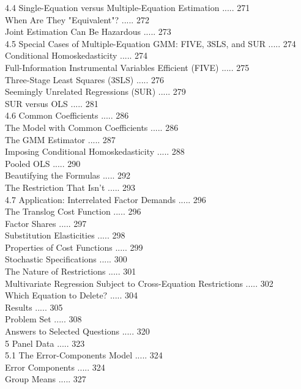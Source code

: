 \documentclass[10pt]{article}
\begin{document}
4.4 Single-Equation versus Multiple-Equation Estimation ..... 271\\
When Are They "Equivalent"? ..... 272\\
Joint Estimation Can Be Hazardous ..... 273\\
4.5 Special Cases of Multiple-Equation GMM: FIVE, 3SLS, and SUR ..... 274\\
Conditional Homoskedasticity ..... 274\\
Full-Information Instrumental Variables Efficient (FIVE) ..... 275\\
Three-Stage Least Squares (3SLS) ..... 276\\
Seemingly Unrelated Regressions (SUR) ..... 279\\
SUR versus OLS ..... 281\\
4.6 Common Coefficients ..... 286\\
The Model with Common Coefficients ..... 286\\
The GMM Estimator ..... 287\\
Imposing Conditional Homoskedasticity ..... 288\\
Pooled OLS ..... 290\\
Beautifying the Formulas ..... 292\\
The Restriction That Isn't ..... 293\\
4.7 Application: Interrelated Factor Demands ..... 296\\
The Translog Cost Function ..... 296\\
Factor Shares ..... 297\\
Substitution Elasticities ..... 298\\
Properties of Cost Functions ..... 299\\
Stochastic Specifications ..... 300\\
The Nature of Restrictions ..... 301\\
Multivariate Regression Subject to Cross-Equation Restrictions ..... 302\\
Which Equation to Delete? ..... 304\\
Results ..... 305\\
Problem Set ..... 308\\
Answers to Selected Questions ..... 320\\
5 Panel Data ..... 323\\
5.1 The Error-Components Model ..... 324\\
Error Components ..... 324\\
Group Means ..... 327\\
\end{document}
